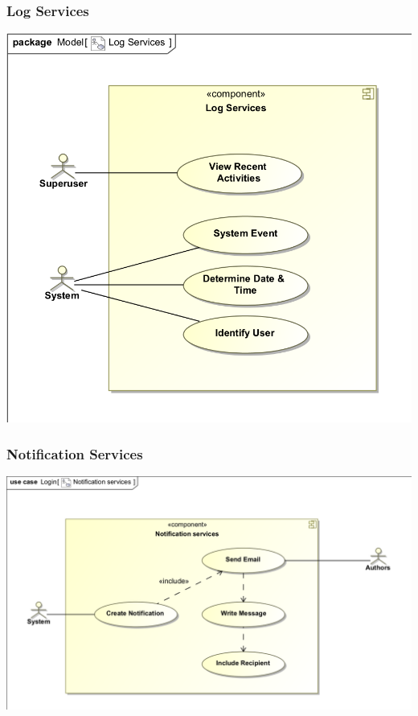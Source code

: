 \documentclass[11pt]{article}
\begin{document}
	\subsubsection{Log Services}
	\begin{center}
		\includegraphics[width=\textwidth]{../Images/LogServices_UseCase.png}\\[0.5cm]
	\end{center}
	\subsubsection{Notification Services}
	\begin{center}
		\includegraphics[width=\textwidth]{../Images/NotificationServices_UseCase.png}\\[0.5cm]
	\end{center}
\end{document}
